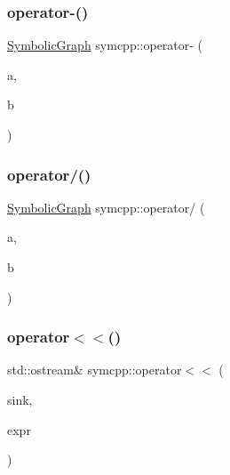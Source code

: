 \mbox{\label{namespacesymcpp_ac2f5ad1173cb5fabb4b8d346878e5035}} 
\subsubsection{\texorpdfstring{operator-\/()}{operator-()}}
{\footnotesize\ttfamily \mbox{\hyperlink{classsymcpp_1_1SymbolicGraph}{Symbolic\+Graph}} symcpp\+::operator-\/ (\begin{DoxyParamCaption}\item[{\mbox{\hyperlink{classsymcpp_1_1SymbolicGraph}{Symbolic\+Graph}}}]{a,  }\item[{const \mbox{\hyperlink{classsymcpp_1_1SymbolicGraph}{Symbolic\+Graph}} \&}]{b }\end{DoxyParamCaption})}

\mbox{\label{namespacesymcpp_a4ec0ca24703ac5e096fceeb538d9e1a9}} 
\subsubsection{\texorpdfstring{operator/()}{operator/()}}
{\footnotesize\ttfamily \mbox{\hyperlink{classsymcpp_1_1SymbolicGraph}{Symbolic\+Graph}} symcpp\+::operator/ (\begin{DoxyParamCaption}\item[{\mbox{\hyperlink{classsymcpp_1_1SymbolicGraph}{Symbolic\+Graph}}}]{a,  }\item[{const \mbox{\hyperlink{classsymcpp_1_1SymbolicGraph}{Symbolic\+Graph}} \&}]{b }\end{DoxyParamCaption})}

\mbox{\label{namespacesymcpp_a4665478217d9f0b9d2f3b815ae8d1bd4}} 
\subsubsection{\texorpdfstring{operator$<$$<$()}{operator<<()}\hspace{0.1cm}{\footnotesize\ttfamily [1/2]}}
{\footnotesize\ttfamily std\+::ostream\& symcpp\+::operator$<$$<$ (\begin{DoxyParamCaption}\item[{std\+::ostream \&}]{sink,  }\item[{const \mbox{\hyperlink{classsymcpp_1_1Expression}{Expression}} \&}]{expr }\end{DoxyParamCaption})}

